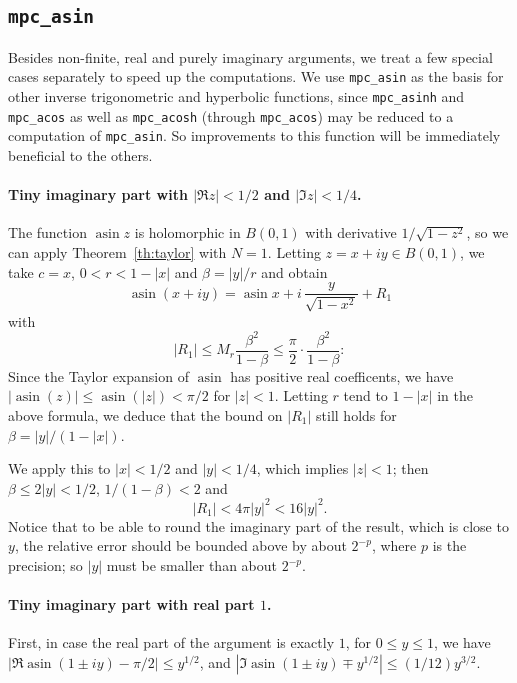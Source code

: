 \documentclass [11pt]{article}
\newcommand {\mpc}{{\tt mpc}}
\newcommand {\asin}{\operatorname {asin}}
\renewcommand {\leq}{\leqslant}
\begin{document}
\subsection {\texttt {mpc\_asin}}

Besides non-finite, real and purely imaginary arguments, we treat a few
special cases separately to speed up the computations.
We use \texttt {\mpc\_asin} as the basis for other inverse trigonometric and
hyperbolic functions, since \texttt {mpc\_asinh} and \texttt {mpc\_acos}
as well as \texttt {mpc\_acosh} (through \texttt {mpc\_acos}) may be reduced
to a computation of \texttt {mpc\_asin}. So improvements to this function
will be immediately beneficial to the others.

\paragraph{Tiny imaginary part with $|\Re z| < 1/2$ and $|\Im z| < 1/4$.}
The function $\asin z$ is holomorphic in $B (0, 1)$
with derivative $1/\sqrt{1-z^2}$, so we can apply Theorem~\ref {th:taylor}
with $N = 1$.
Letting $z = x + i y \in B (0, 1)$, we take $c = x$, $0 < r < 1 - |x|$
and $\beta = |y| / r$ and obtain
\[
\asin (x + i y) = \asin x + i \, \frac{y}{\sqrt {1 - x^2}} + R_1
\]
with
\[
|R_1| \leq M_r \frac {\beta^2}{1 - \beta}
\leq \frac {\pi}{2} \cdot \frac {\beta^2}{1 - \beta}:
\]
Since the Taylor expansion of $\asin$ has positive real coefficents,
we have $|\asin (z)| \leq \asin (|z|) < \pi / 2$ for $|z| < 1$.
Letting $r$ tend to $1 - |x|$ in the above formula, we deduce that the
bound on $|R_1|$ still holds for $\beta = |y| / (1 - |x|)$.

We apply this to $|x| < 1/2$ and $|y| < 1/4$, which implies $|z| < 1$;
then $\beta \leq 2 |y| < 1/2$, $1 / (1 - \beta) < 2$ and
\[
|R_1| < 4 \pi |y|^2 < 16 |y|^2.
\]
Notice that to be able to round the imaginary part of the result,
which is close to $y$, the relative error should be bounded above by
about $2^{-p}$, where $p$ is the precision; so $|y|$ must be smaller
than about $2^{-p}$.


\paragraph{Tiny imaginary part with real part $1$.}
First, in case the real part of the argument is exactly $1$,
for $0 \leq y \leq 1$, we have $|\Re \asin (1 \pm iy) - \pi/2|
\leq y^{1/2}$, and $|\Im \asin (1 \pm iy) \mp y^{1/2}| \leq (1/12) y^{3/2}$.
\end{document}
